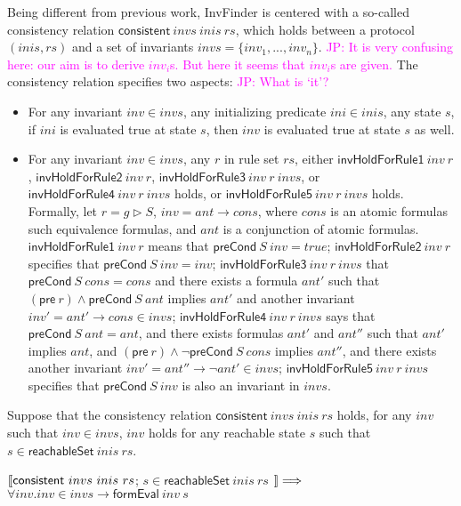 \documentclass{llncs}
\newcommand\JP[1]{\textcolor{magenta}{JP: #1}}
\begin{document}
Being different from previous work, {\sf InvFinder} is centered with
a so-called consistency relation $\mathsf{consistent}~ invs ~inis~
rs$,
 which holds between a protocol $(inis,rs)$ and
a set of invariants $invs=\{inv_1,..., inv_n\}$. \JP{It is very
confusing here: our aim is to derive $inv_i$s. But here it seems
that $inv_i$s are given.} The consistency relation specifies two
aspects: \JP{What is `it'?}
%
\begin{itemize}
\item For any invariant $inv \in invs$,
any initializing predicate $ini \in inis$, any
state $s$, if $ini$ is evaluated true at state $s$, then $inv$ is
evaluated true at state $s$ as well.

\item For any invariant $inv \in invs$, any $r$ in rule set
$rs$, either $\mathsf{invHoldForRule1 }~inv~ r$,
$\mathsf{invHoldForRule2 }~inv~ r$, $\mathsf{invHoldForRule3 }~inv~
r~invs$, or $\mathsf{invHoldForRule4 }~inv~ r~invs$ holds, or
$\mathsf{invHoldForRule5}~inv~ r~invs$ holds. Formally, let $r=g
\vartriangleright  S$, $inv=ant \longrightarrow cons$, where $cons$
is an atomic formulas such equivalence formulas, and $ant$ is a
conjunction of atomic formulas. $\mathsf{invHoldForRule1 }~inv~ r$
means that
 $\mathsf{preCond}~S~inv=true$; $\mathsf{invHoldForRule2 }~inv~ r$ specifies that  $\mathsf{preCond}~S~inv=inv$; $\mathsf{invHoldForRule3 }~inv~ r~invs$
  that $\mathsf{preCond}~S~cons=cons$ and there exists a formula $ant'$ such that
$(\mathsf{pre}~r )\wedge \mathsf{preCond}~S~ant$ implies $ant'$ and
another invariant $inv'=ant' \longrightarrow cons \in invs$;
$\mathsf{invHoldForRule4}~inv~ r~invs$ says
  that $\mathsf{preCond}~S~ant=ant$, and there exists formulas
  $ant'$ and $ant''$
such that  $ant'$ implies $ant$, and $(\mathsf{pre}~r )\wedge \neg
\mathsf{preCond}~S~cons$ implies  $ant''$, and there exists another
invariant $inv'=ant'' \longrightarrow \neg ant' \in invs$;
$\mathsf{invHoldForRule5}~inv~ r~invs$ specifies that
$\mathsf{preCond}~S~inv$ is also an invariant in  $invs$.
\end{itemize}

Suppose that the consistency relation $\mathsf{consistent}~ invs
~inis~ rs$ holds,   for any $inv$ such that $inv \in invs$, $inv$
holds for any reachable state $s$ such that $s  \in
\mathsf{reachableSet}~ inis~ rs$.
\begin{theorem}\label{consistentLemma}
  $\emph{$\mathopen{\lbrack\mkern-3mu\lbrack}$} \mathsf{consistent}~ invs ~inis~ rs$; $s  \in \mathsf{reachableSet}~ inis~ rs$
  $\emph{$\mathclose{\rbrack\mkern-3mu\rbrack}$}\Longrightarrow$ $\forall inv. inv \in invs \longrightarrow
\mathsf{formEval}~ inv ~s$    \end{theorem}
\end{document}
